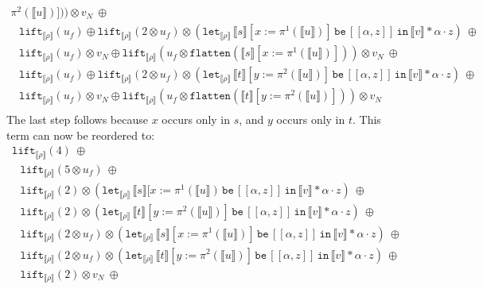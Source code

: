 \documentclass[a4paper,UKenglish,cleveref,autoref,numberwithinsect]{lipics-v2019}
\theoremstyle{definition}
\newcommand{\expair}[2]{[#1,#2]}
\newcommand{\flatten}{\mathtt{flatten}}
\newcommand{\lift}{\mathtt{lift}}
\newcommand{\typeinterpret}[1]{\llbracket #1 \rrbracket}
\newcommand{\interpret}[1]{\llbracket #1 \rrbracket}
\newcommand{\xlet}[4]{\mathtt{let}_{#1}\,#2\,\mathtt{be}\,[#3]\,\mathtt{in}\,#4}
\begin{document}
\begin{itemize}
\[\begin{array}{l}
    \pi^2(\interpret{u})])) \otimes v_N\ \oplus \\
  \phantom{A}
  \lift_{\typeinterpret{\rho}}(u_f) \oplus
    \lift_{\typeinterpret{\rho}}(2 \otimes u_f) \otimes
    (\xlet{\typeinterpret{\rho}}{\interpret{s}[x:=\pi^1(
    \interpret{u})]}{\expair{\alpha}{z}}{
      \interpret{v} * \alpha \cdot z})\ \oplus \\
  \phantom{A}
  \lift_{\typeinterpret{\rho}}(u_f) \otimes v_N \oplus
    \lift_{\typeinterpret{\rho}}(u_f \otimes
    \flatten(\interpret{s}[x:=\pi^1(\interpret{u})])) \otimes v_N\ 
    \oplus \\
  \phantom{A}
  \lift_{\typeinterpret{\rho}}(u_f) \oplus
    \lift_{\typeinterpret{\rho}}(2 \otimes u_f) \otimes
    (\xlet{\typeinterpret{\rho}}{\interpret{t}[y:=\pi^2(
    \interpret{u})]}{\expair{\alpha}{z}}{\interpret{v} * \alpha
    \cdot z})\ \oplus \\
  \phantom{A}
  \lift_{\typeinterpret{\rho}}(u_f) \otimes v_N \oplus
    \lift_{\typeinterpret{\rho}}(u_f \otimes\flatten(\interpret{t}[y:=
    \pi^2(\interpret{u})])) \otimes v_N \\
  \end{array}
  \]
  The last step follows because $x$ occurs only in $s$, and $y$ occurs
  only in $t$.  This term can now be reordered to:
  \[
  \begin{array}{l}
  \lift_{\typeinterpret{\rho}}(4)\ \oplus \\
  \phantom{A}
  \lift_{\typeinterpret{\rho}}(5 \otimes u_f)\ \oplus \\
  \phantom{A}
  \lift_{\typeinterpret{\rho}}(2) \otimes
  (\xlet{\typeinterpret{\rho}}{\interpret{s}[x:=\pi^1(\interpret{u})}{
    \expair{\alpha}{z}}{\interpret{v} * \alpha \cdot z})\ \oplus \\
  \phantom{A}
  \lift_{\typeinterpret{\rho}}(2) \otimes
    (\xlet{\typeinterpret{\rho}}{\interpret{t}[y:=\pi^2(\interpret{u})]}{
    \expair{\alpha}{z}}{\interpret{v} * \alpha \cdot z})\ \oplus \\
  \phantom{A}
    \lift_{\typeinterpret{\rho}}(2 \otimes u_f) \otimes
    (\xlet{\typeinterpret{\rho}}{\interpret{s}[x:=\pi^1(
    \interpret{u})]}{\expair{\alpha}{z}}{
    \interpret{v} * \alpha \cdot z})\ \oplus \\
  \phantom{A}
    \lift_{\typeinterpret{\rho}}(2 \otimes u_f) \otimes
    (\xlet{\typeinterpret{\rho}}{\interpret{t}[y:=\pi^2(
    \interpret{u})]}{\expair{\alpha}{z}}{
    \interpret{v} * \alpha \cdot z})\ \oplus \\
  \phantom{A}
  \lift_{\typeinterpret{\rho}}(2) \otimes v_N\ \oplus \\

\end{array}\]
\end{itemize}
\end{document}
